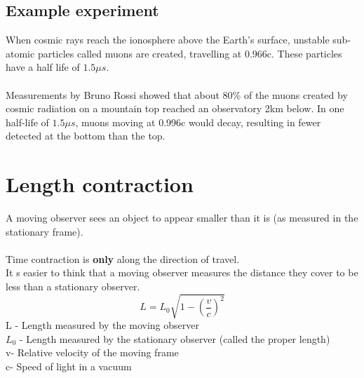 \documentclass[12pt]{article}
\begin{document}
\subsection{Example experiment}
When cosmic rays reach the ionosphere above the Earth's surface, unstable sub-atomic particles called muons are created, travelling at 0.966c. These particles have a half life of $1.5\mu s$.\\
\\
Measurements by Bruno Rossi showed that about 80\% of the muons created by cosmic radiation on a mountain top reached an observatory 2km below. In one half-life of $1.5\mu s$, muons moving at 0.996c would decay, resulting in fewer detected at the bottom than the top.
\section{Length contraction}
A moving observer sees an object to appear smaller than it is (as measured in the stationary frame).\\
\\
Time contraction is \textbf{only} along the direction of travel.\\
It s easier to think that a moving observer measures the distance they cover to be less than a stationary observer.
$$L=L_0\sqrt{1-(\frac{v}{c})^2}$$
L - Length measured by the moving observer\\
$L_0$ - Length measured by the stationary observer (called the proper length)\\
v- Relative velocity of the moving frame\\
c- Speed of light in a vacuum
\end{document}
